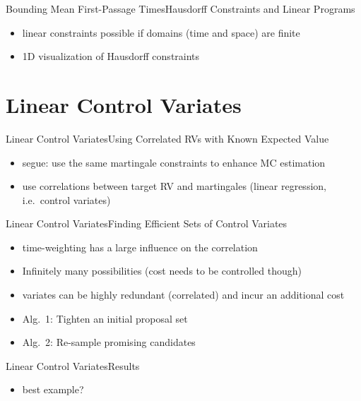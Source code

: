\documentclass{beamer}
\begin{document}
\begin{frame}{Bounding Mean First-Passage Times}{Hausdorff Constraints and Linear Programs}
  \begin{itemize}
    \item linear constraints possible if domains (time and space) are finite
    \item 1D visualization of Hausdorff constraints
  \end{itemize}
\end{frame}

\section{Linear Control Variates}
\begin{frame}{Linear Control Variates}{Using Correlated RVs with Known Expected Value}
  \begin{itemize}
    \item segue: use the same martingale constraints to enhance MC estimation
    \item use correlations between target RV and martingales (linear regression, i.e.\ control variates)
  \end{itemize}
\end{frame}

\begin{frame}{Linear Control Variates}{Finding Efficient Sets of Control Variates}
  \begin{itemize}
    \item time-weighting has a large influence on the correlation
    \item Infinitely many possibilities (cost needs to be controlled though)
    \item variates can be highly redundant (correlated) and incur an additional cost
    \item Alg.~1: Tighten an initial proposal set
    \item Alg.~2: Re-sample promising candidates
  \end{itemize}
\end{frame}

\begin{frame}{Linear Control Variates}{Results}
  \begin{itemize}
    \item best example?
  \end{itemize}
\end{frame}
\end{document}
